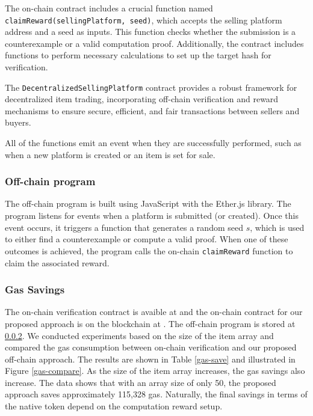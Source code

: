 \documentclass[runningheads]{llncs}
\begin{document}
The on-chain contract includes a crucial function named \texttt{claimReward(sellingPlatform, seed)}, which accepts the selling platform address and a seed as inputs. This function checks whether the submission is a counterexample or a valid computation proof. Additionally, the contract includes functions to perform necessary calculations to set up the target hash for verification.

The \texttt{DecentralizedSellingPlatform} contract provides a robust framework for decentralized item trading, incorporating off-chain verification and reward mechanisms to ensure secure, efficient, and fair transactions between sellers and buyers.

All of the functions emit an event when they are successfully performed, such as when a new platform is created or an item is set for sale.
\subsubsection{Off-chain program}
The off-chain program is built using JavaScript with the Ether.js library. The program listens for events when a platform is submitted (or created). Once this event occurs, it triggers a function that generates a random seed \( s \), which is used to either find a counterexample or compute a valid proof. When one of these outcomes is achieved, the program calls the on-chain \texttt{claimReward} function to claim the associated reward.
\subsubsection{Gas Savings} The on-chain verification contract is avaible at \cite{} and the on-chain contract for our proposed approach is on the blockchain at \cite{}. The off-chain program is stored at \ref{}. We conducted experiments based on the size of the item array and compared the gas consumption between on-chain verification and our proposed off-chain approach. The results are shown in Table \ref{gas-save} and illustrated in Figure \ref{gas-compare}. As the size of the item array increases, the gas savings also increase. The data shows that with an array size of only 50, the proposed approach saves approximately 115,328 gas. Naturally, the final savings in terms of the native token depend on the computation reward setup.
\end{document}
